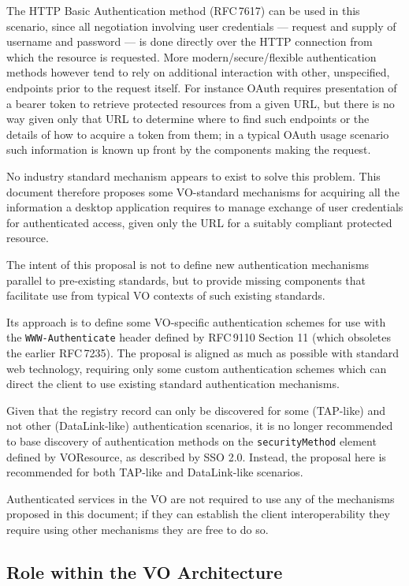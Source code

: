 \documentclass[11pt,a4paper]{ivoa}
\newcommand{\rfc}[1]{RFC\,#1}
\newcommand{\header}[1]{{\tt #1}}
\begin{document}
The HTTP Basic Authentication method (\rfc{7617}) can be used in this scenario,
since all negotiation involving user credentials ---
request and supply of username and password ---
is done directly
over the HTTP connection from which the resource is requested.
More modern/secure/flexible authentication methods however tend to
rely on additional interaction with other, unspecified, endpoints
prior to the request itself.  For instance OAuth requires presentation
of a bearer token to retrieve protected resources from a given URL,
but there is no way given only that URL to determine where to find
such endpoints or the details of how to acquire a token from them;
in a typical OAuth usage scenario such information is known up front
by the components making the request.

No industry standard mechanism appears to exist to solve this problem.
This document therefore proposes some VO-standard mechanisms for
acquiring all the information a desktop application requires
to manage exchange of user credentials for authenticated access,
given only the URL for a suitably compliant protected resource.

The intent of this proposal is not to define new authentication
mechanisms parallel to pre-existing standards, but to provide
missing components that facilitate use from typical VO contexts
of such existing standards.

Its approach is to define some VO-specific authentication schemes
for use with the \header{WWW-Authenticate} header defined by
\rfc{9110} Section 11 (which obsoletes the earlier \rfc{7235}).
The proposal is aligned as much as possible with standard web
technology, requiring only some custom authentication schemes
which can direct the client to use existing standard authentication
mechanisms.

Given that the registry record can only be discovered for some
(TAP-like) and not other (DataLink-like) authentication scenarios,
it is no longer recommended to base discovery of authentication methods
on the {\tt securityMethod} element
defined by VOResource, as described by SSO 2.0.
Instead, the proposal here is recommended for both TAP-like and DataLink-like
scenarios.

Authenticated services in the VO are not required to use any of the  
mechanisms proposed in this document; if they can establish the
client interoperability they require using other mechanisms
they are free to do so.

\subsection{Role within the VO Architecture}
\end{document}
